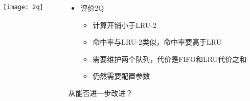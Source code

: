 \begin{frame}[plain]
	\frametitle{ }
	\begin{columns}
		\begin{column}{.4\textwidth}
			\centering
			\texttt{[image: 2q]}
		\end{column}
		
		\begin{column}{.6\textwidth}
			
			\begin{itemize}
				\item 评价2Q
				\begin{itemize}
					\item 计算开销小于LRU-2
					\item 命中率与LRU-2类似，命中率要高于LRU
					\item 需要维护两个队列，代价是FIFO和LRU代价之和
					\item 仍然需要配置参数

				\end{itemize}
			\end{itemize}
						\centering
						\large 从能否进一步改进？
												
		\end{column}
		
		
	\end{columns}
\end{frame}

